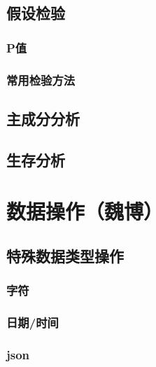 \documentclass[]{book}
\begin{document}
\hypertarget{section-24}{%
\section{假设检验}\label{section-24}}

\hypertarget{p}{%
\subsection{P值}\label{p}}

\hypertarget{section-25}{%
\subsection{常用检验方法}\label{section-25}}

\hypertarget{section-26}{%
\section{主成分分析}\label{section-26}}

\hypertarget{section-27}{%
\section{生存分析}\label{section-27}}

\hypertarget{section-28}{%
\chapter{数据操作（魏博）}\label{section-28}}

\hypertarget{section-29}{%
\section{特殊数据类型操作}\label{section-29}}

\hypertarget{section-30}{%
\subsection{字符}\label{section-30}}

\hypertarget{section-31}{%
\subsection{日期/时间}\label{section-31}}

\hypertarget{json-1}{%
\subsection{json}\label{json-1}}
\end{document}
